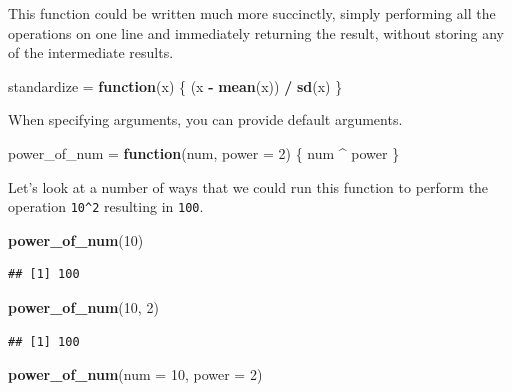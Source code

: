 \documentclass[]{book}
\newenvironment{Shaded}{\begin{snugshade}}{\end{snugshade}}
\newcommand{\KeywordTok}[1]{\textcolor[rgb]{0.13,0.29,0.53}{\textbf{#1}}}
\newcommand{\DataTypeTok}[1]{\textcolor[rgb]{0.13,0.29,0.53}{#1}}
\newcommand{\DecValTok}[1]{\textcolor[rgb]{0.00,0.00,0.81}{#1}}
\newcommand{\StringTok}[1]{\textcolor[rgb]{0.31,0.60,0.02}{#1}}
\newcommand{\ControlFlowTok}[1]{\textcolor[rgb]{0.13,0.29,0.53}{\textbf{#1}}}
\newcommand{\OperatorTok}[1]{\textcolor[rgb]{0.81,0.36,0.00}{\textbf{#1}}}
\newcommand{\NormalTok}[1]{#1}
\theoremstyle{definition}
\theoremstyle{definition}
\theoremstyle{definition}
\theoremstyle{remark}
\begin{document}
This function could be written much more succinctly, simply performing
all the operations on one line and immediately returning the result,
without storing any of the intermediate results.

\begin{Shaded}
\begin{Highlighting}[]
\NormalTok{standardize =}\StringTok{ }\ControlFlowTok{function}\NormalTok{(x) \{}
\NormalTok{  (x }\OperatorTok{-}\StringTok{ }\KeywordTok{mean}\NormalTok{(x)) }\OperatorTok{/}\StringTok{ }\KeywordTok{sd}\NormalTok{(x)}
\NormalTok{\}}
\end{Highlighting}
\end{Shaded}

When specifying arguments, you can provide default arguments.

\begin{Shaded}
\begin{Highlighting}[]
\NormalTok{power_of_num =}\StringTok{ }\ControlFlowTok{function}\NormalTok{(num, }\DataTypeTok{power =} \DecValTok{2}\NormalTok{) \{}
\NormalTok{  num }\OperatorTok{^}\StringTok{ }\NormalTok{power}
\NormalTok{\}}
\end{Highlighting}
\end{Shaded}

Let's look at a number of ways that we could run this function to
perform the operation \texttt{10\^{}2} resulting in \texttt{100}.

\begin{Shaded}
\begin{Highlighting}[]
\KeywordTok{power_of_num}\NormalTok{(}\DecValTok{10}\NormalTok{)}
\end{Highlighting}
\end{Shaded}

\begin{verbatim}
## [1] 100
\end{verbatim}

\begin{Shaded}
\begin{Highlighting}[]
\KeywordTok{power_of_num}\NormalTok{(}\DecValTok{10}\NormalTok{, }\DecValTok{2}\NormalTok{)}
\end{Highlighting}
\end{Shaded}

\begin{verbatim}
## [1] 100
\end{verbatim}

\begin{Shaded}
\begin{Highlighting}[]
\KeywordTok{power_of_num}\NormalTok{(}\DataTypeTok{num =} \DecValTok{10}\NormalTok{, }\DataTypeTok{power =} \DecValTok{2}\NormalTok{)}
\end{Highlighting}
\end{Shaded}
\end{document}
